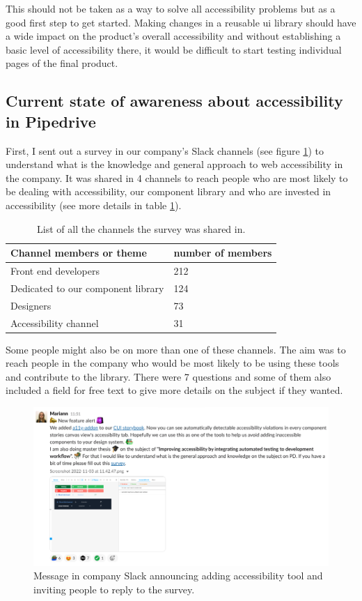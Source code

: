 \documentclass{master_thesis}
\begin{document}
This should not be taken as a way to solve all accessibility problems but as a good first step to get started. Making changes in a reusable \ac{ui} library should have a wide impact on the product's overall accessibility and without establishing a basic level of accessibility there, it would be difficult to start testing individual pages of the final product.

\subsection{Current state of awareness about accessibility in Pipedrive}

First, I sent out a survey in our company's Slack channels (see figure \ref{fig:slack-message}) to understand what is the knowledge and general approach to web accessibility in the company. It was shared in 4 channels to reach people who are most likely to be dealing with accessibility, our component library and who are invested in accessibility (see more details in table \ref{table:survey-shared}).

\begin{table}[H]
	\centering
	\begin{tabular}{|l|l|}
		\hline
		\textbf{Channel members or theme} & \textbf{number of members}  \\
		\hline
		Front end developers  & 212  \\
		\hline
		Dedicated to our component library  & 124  \\
		\hline
		Designers  & 73  \\
		\hline
		Accessibility channel  & 31  \\
		\hline
	\end{tabular}
	\caption{List of all the channels the survey was shared in.}
	\label{table:survey-shared}
\end{table}

Some people might also be on more than one of these channels. The aim was to reach people in the company who would be most likely to be using these tools and contribute to the library. There were 7 questions and some of them also included a field for free text to give more details on the subject if they wanted.

\begin{figure}[H]
	\includegraphics[width=\textwidth]{img/survey.png}
	\caption{Message in company Slack announcing adding accessibility tool and inviting people to reply to the survey.}
	\label{fig:slack-message}
\end{figure}
\end{document}
